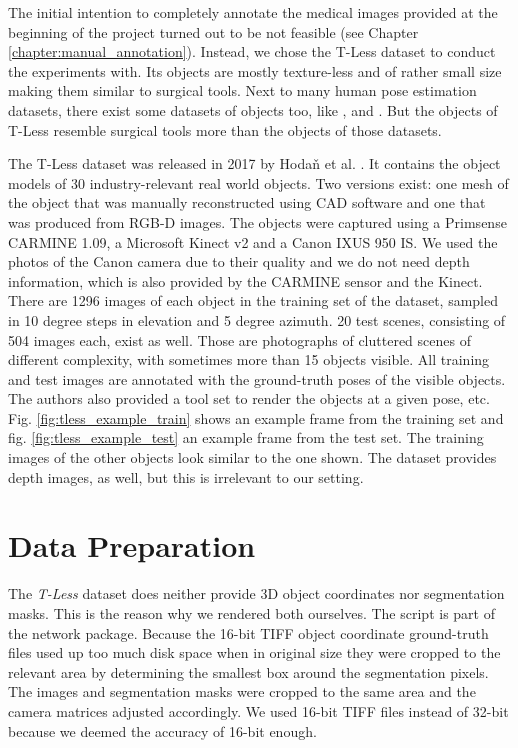 The initial intention to completely annotate the medical images provided at the beginning of the project turned out to be not feasible (see Chapter \ref{chapter:manual_annotation}). Instead, we chose the T-Less dataset to conduct the experiments with. Its objects are mostly texture-less  and of rather small size making them similar to surgical tools. Next to many human pose estimation datasets, there exist some datasets of objects too, like \cite{next_view_dataset}, \cite{pracsys_dataset} and \cite{rigid_body_dataset}. But the objects of T-Less resemble surgical tools more than the objects of those datasets.

The T-Less dataset was released in 2017 by Hoda\v{n} et al. \cite{tless}. It contains the object models of 30 industry-relevant real world objects. Two versions exist: one mesh of the object that was manually reconstructed using CAD software and one that was produced from RGB-D images. The objects were captured using a Primsense CARMINE 1.09, a Microsoft Kinect v2 and a Canon IXUS 950 IS. We used the photos of the Canon camera due to their quality and we do not need depth information, which is also provided by the CARMINE sensor and the Kinect. There are 1296 images of each object in the training set of the dataset, sampled in 10 degree steps in elevation and 5 degree azimuth. 20 test scenes, consisting of 504 images each, exist as well. Those are photographs of cluttered scenes of different complexity, with sometimes more than 15 objects visible. All training and test images are annotated with the ground-truth poses of the visible objects. The authors also provided a tool set to render the objects at a given pose, etc. Fig. \ref{fig:tless_example_train} shows an example frame from the training set and fig. \ref{fig:tless_example_test} an example frame from the test set. The training images of the other objects look similar to the one shown. The dataset provides depth images, as well, but this is irrelevant to our setting.

\section{Data Preparation}

The \textit{T-Less} dataset does neither provide 3D object coordinates nor segmentation masks. This is the reason why we rendered both ourselves. The script is part of the network package. Because the 16-bit TIFF object coordinate ground-truth files used up too much disk space when in original size they were cropped to the relevant area by determining the smallest box around the segmentation pixels. The images and segmentation masks were cropped to the same area and the camera matrices adjusted accordingly. We used 16-bit TIFF files instead of 32-bit because we deemed the accuracy of 16-bit enough.

